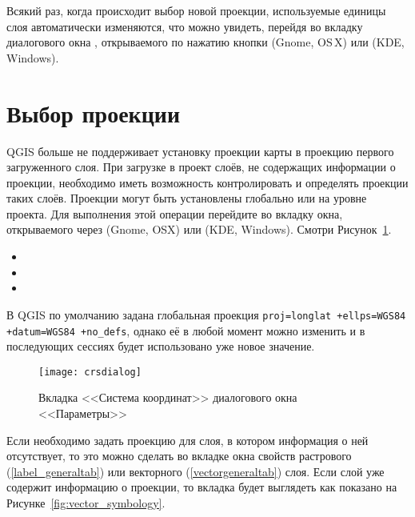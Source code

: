 Всякий раз, когда происходит выбор новой проекции, используемые единицы
слоя автоматически изменяются, что можно увидеть, перейдя во вкладку
 диалогового окна , открываемого по нажатию кнопки  (Gnome,
OS\,X) или  (KDE, Windows).

\section{Выбор проекции}
\label{sec:projection-specifying}

QGIS больше не поддерживает установку проекции карты в проекцию
первого загруженного слоя. При загрузке в проект слоёв, не содержащих
информации о проекции, необходимо иметь возможность контролировать и
определять проекции таких слоёв. Проекции могут быть установлены глобально
или на уровне проекта. Для выполнения этой операции перейдите во вкладку
 окна, открываемого через 
\arrow {} (Gnome, OSX) или
 \arrow {} (KDE,
Windows). Смотри Рисунок~\ref{fig:crsdialog}.

\begin{itemize}[label=--]
\item {}
\item {}
\item {}
\end{itemize}

В QGIS по умолчанию задана глобальная проекция \texttt{proj=longlat +ellps=WGS84
+datum=WGS84 +no\_defs}, однако её в любой момент можно изменить и в последующих
сессиях будет использовано уже новое значение.

\begin{figure}[ht]
   \centering
   \texttt{[image: crsdialog]}
   \caption{Вкладка <<Система координат>> диалогового окна <<Параметры>> \wincaption}\label{fig:crsdialog}
\end{figure}

Если необходимо задать проекцию для слоя, в котором информация о ней
отсутствует, то это можно сделать во вкладке  окна свойств растрового
(\ref{label_generaltab}) или векторного (\ref{vectorgeneraltab}) слоя. Если
слой уже содержит информацию о проекции, то вкладка будет выглядеть как показано
на Рисунке~\ref{fig:vector_symbology}.

